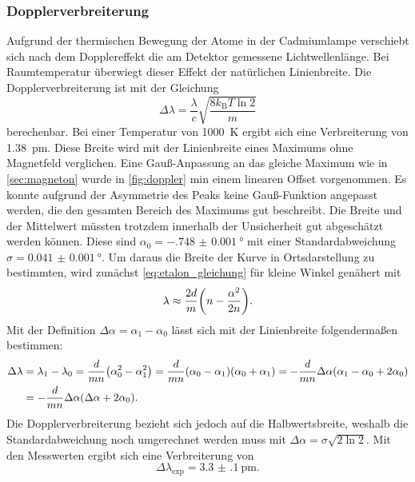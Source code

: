 \subsubsection{Dopplerverbreiterung}
Aufgrund der thermischen Bewegung der Atome in der Cadmiumlampe verschiebt sich 
nach dem Dopplereffekt die am Detektor gemessene Lichtwellenlänge. Bei Raumtemperatur
überwiegt dieser Effekt der natürlichen Linienbreite. Die Dopplerverbreiterung
ist mit der Gleichung 
\begin{equation*}
    \Delta\lambda = \frac{\lambda}{c}\sqrt{\frac{8k_\mathrm BT\ln 2}{m}}
\end{equation*}
berechenbar. Bei einer Temperatur von \SI{1000}{\kelvin} ergibt sich eine Verbreiterung von 
\SI{1.38}{\pm}.  Diese Breite wird mit der Linienbreite eines Maximums ohne Magnetfeld verglichen. 
Eine Gauß-Anpassung an das gleiche Maximum wie in \cref{sec:magneton} wurde in \cref{fig:doppler}
min einem linearen Offset vorgenommen. Es konnte aufgrund 
der Asymmetrie des Peaks keine Gauß-Funktion angepasst werden, die den gesamten Bereich des Maximums
gut beschreibt. Die Breite und der Mittelwert müssten trotzdem innerhalb der Unsicherheit 
gut abgeschätzt werden können. Diese sind $\alpha_0 = -\SI{.748(1)}{\degree}$ mit einer 
Standardabweichung $\sigma = \SI{0.041(1)}{\degree}$. Um daraus die Breite der Kurve 
in Ortsdarstellung zu bestimmten, wird zunächst \cref{eq:etalon_gleichung} für kleine Winkel genähert mit 
\begin{equation*}
    \lambda \approx \frac{2d}{m}\qty(n-\frac{\alpha^2}{2n}).
\end{equation*}
Mit der Definition $\Delta\alpha=\alpha_1 - \alpha_0$ lässt sich mit der Linienbreite folgendermaßen 
bestimmen:
\begin{align*}
    \Delta\lambda &= \lambda_1 - \lambda_0 = \frac{d}{mn}\qty(\alpha_0^2 - \alpha_1^2) 
    = \frac{d}{mn}(\alpha_0-\alpha_1)(\alpha_0 + \alpha_1)
    = -\frac{d}{mn}\Delta\alpha(\alpha_1 - \alpha_0 + 2\alpha_0)\\
    &= -\frac{d}{mn}\Delta\alpha(\Delta\alpha + 2\alpha_0).
\end{align*}
Die Dopplerverbreiterung bezieht sich jedoch auf die Halbwertsbreite, weshalb die Standardabweichung noch 
umgerechnet werden muss mit $\Delta\alpha = \sigma\sqrt{2\ln 2}$. Mit den Messwerten ergibt sich eine 
Verbreiterung von 
\begin{equation}
    \Delta\lambda_\mathrm{exp} = \SI{3.3(1)}{\pm}.
\end{equation}


